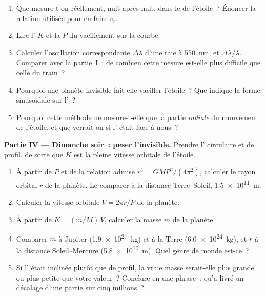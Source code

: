 \begin{problem}
\begin{enumerate}[resume]
  \item Que mesure-t-on réellement, nuit après nuit, dans le
        \emph{} de l'étoile~? Énoncer la relation
        utilisée pour en faire $v_r$.
  \item Lire l' $K$ et la
         $P$ du vacillement sur la courbe.
  \item Calculer l'oscillation correspondante $\Delta\lambda$ d'une raie
        à \qty{550}{nm}, et $\Delta\lambda/\lambda$. Comparer avec la
        partie~I~: de combien cette mesure est-elle plus difficile que
        celle du train~?
  \item Pourquoi une planète invisible fait-elle vaciller l'étoile~?
        Que indique la forme sinusoïdale sur l'~?
  \item Pourquoi cette méthode ne mesure-t-elle que la partie
        \emph{radiale} du mouvement de l'étoile, et que verrait-on si
        l' était face à nous~?
\end{enumerate}

\medskip
\noindent\textbf{Partie IV --- Dimanche soir~: peser l'invisible.}
Prendre l' circulaire et de profil, de sorte que $K$
est la pleine vitesse orbitale de l'étoile.
\begin{enumerate}[resume]
  \item À partir de $P$ et de la relation admise
        $r^3 = G M P^2/(4\pi^2)$, calculer le rayon orbital $r$ de la
        planète. Le comparer à la distance Terre--Soleil,
        \qty{1.5e11}{m}.
  \item Calculer la vitesse orbitale $V = 2\pi r/P$ de la planète.
  \item À partir de $K = (m/M)\,V$, calculer la masse $m$ de la
        planète.
  \item Comparer $m$ à Jupiter (\qty{1.9e27}{kg}) et à la Terre
        (\qty{6.0e24}{kg}), et $r$ à la distance Soleil--Mercure
        (\qty{5.8e10}{m}). Quel genre de monde est-ce~?
  \item Si l' était inclinée plutôt que de profil, la
        vraie masse serait-elle plus grande ou plus petite que votre
        valeur~? Conclure en une phrase~: qu'a livré un décalage
         d'une partie sur cinq millions~?
\end{enumerate}
\end{problem}
